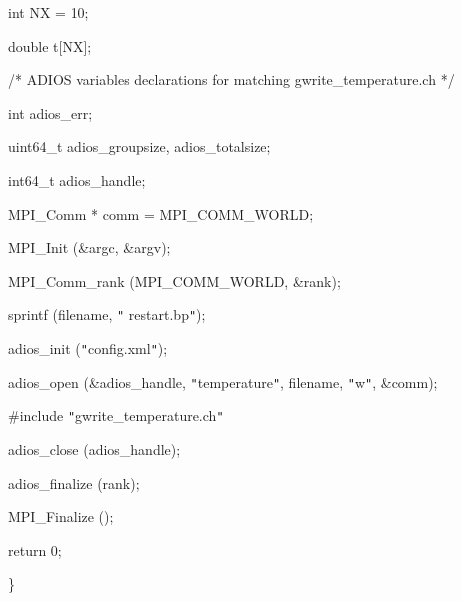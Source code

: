 \vspace{10pt}
int              NX\textbf{ }=\textbf{ }10;

\vspace{10pt}
double      t[NX];

\vspace{22pt}
/* ADIOS variables declarations for matching gwrite\_temperature.ch */

\vspace{10pt}
{\color{color02} int                  adios\_err;}

\vspace{10pt}
{\color{color02} uint64\_t       adios\_groupsize, adios\_totalsize;}

\vspace{10pt}
{\color{color02} int64\_t          adios\_handle;}

\vspace{10pt}
{\color{color02} MPI\_Comm  * comm =  MPI\_COMM\_WORLD;}

\vspace{22pt}
MPI\_Init (\&argc, \&argv);

\vspace{10pt}
MPI\_Comm\_rank (MPI\_COMM\_WORLD, \&rank);

\vspace{10pt}
sprintf (filename, \texttt{"}{\color{color02} restart.bp}\texttt{"});

\vspace{10pt}
{\color{color02} adios\_init (\texttt{"}config.xml\texttt{"});}

\vspace{10pt}
{\color{color02} adios\_open (\&adios\_handle, \texttt{"}temperature\texttt{"}, 
filename, \texttt{"}w\texttt{"}, \&comm);}

\vspace{10pt}
{\color{color02} \#include \texttt{"}gwrite\_temperature.ch\texttt{"}}

\vspace{10pt}
{\color{color02} adios\_close (adios\_handle);}

\vspace{10pt}
{\color{color02} adios\_finalize (rank);}

\vspace{10pt}
MPI\_Finalize ();

\vspace{10pt}
return 0;

\vspace{10pt}
\leftskip=0pt
\}

